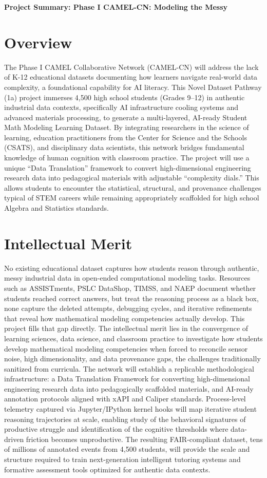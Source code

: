 \documentclass[11pt]{article}
\begin{document}
\noindent \textbf{Project Summary: Phase I CAMEL-CN: Modeling the Messy}

\section*{Overview}
The Phase I CAMEL Collaborative Network (CAMEL-CN) will address the lack of K-12 educational datasets documenting how learners navigate real-world data complexity, a foundational capability for AI literacy. This Novel Dataset Pathway (1a) project immerses 4,500 high school students (Grades 9--12) in authentic industrial data contexts, specifically AI infrastructure cooling systems and advanced materials processing, to generate a multi-layered, AI-ready Student Math Modeling Learning Dataset. By integrating researchers in the science of learning, education practitioners from the Center for Science and the Schools (CSATS), and disciplinary data scientists, this network bridges fundamental knowledge of human cognition with classroom practice. The project will use a unique ``Data Translation'' framework to convert high-dimensional engineering research data into pedagogical materials with adjustable ``complexity dials.'' This allows students to encounter the statistical, structural, and provenance challenges typical of STEM careers while remaining appropriately scaffolded for high school Algebra and Statistics standards.

\section*{Intellectual Merit}
No existing educational dataset captures how students reason through authentic, messy industrial data in open-ended computational modeling tasks. Resources such as ASSISTments, PSLC DataShop, TIMSS, and NAEP document whether students reached correct answers, but treat the reasoning process as a black box, none capture the deleted attempts, debugging cycles, and iterative refinements that reveal how mathematical modeling competencies actually develop. This project fills that gap directly.
The intellectual merit lies in the convergence of learning sciences, data science, and classroom practice to investigate how students develop mathematical modeling competencies when forced to reconcile sensor noise, high dimensionality, and data provenance gaps,  the challenges traditionally sanitized from curricula. The network will establish a replicable methodological infrastructure: a Data Translation Framework for converting high-dimensional engineering research data into pedagogically scaffolded materials, and AI-ready annotation protocols aligned with xAPI and Caliper standards. Process-level telemetry captured via Jupyter/IPython kernel hooks will map iterative student reasoning trajectories at scale, enabling study of the behavioral signatures of productive struggle and identification of the cognitive thresholds where data-driven friction becomes unproductive. The resulting FAIR-compliant dataset, tens of millions of annotated events from 4,500 students, will provide the scale and structure required to train next-generation intelligent tutoring systems and formative assessment tools optimized for authentic data contexts.
\end{document}
